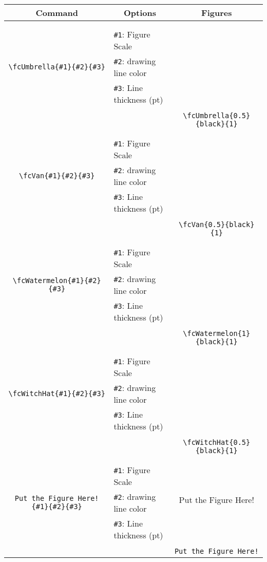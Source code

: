 \documentclass{article}
\begin{document}
\begin{table}[H]\centering\begin{tabular}{|c|l|c|}\hline {\bf Command}& \multicolumn{1}{c|}{{\bf Options}} & {\bf Figures}\\  \hline	&&\multirow{5}{*}{\fcUmbrella{0.5}{black}{1}}\\	&&\\	&\verb|#1|: Figure Scale &\\	\verb|\fcUmbrella{#1}{#2}{#3}|&	\verb|#2|: drawing line color &\\	&\verb|#3|: Line thickness (pt) &\\ &&\\&&	\verb|\fcUmbrella{0.5}{black}{1}|\\\hline 	
	&&\multirow{5}{*}{\fcVan{0.5}{black}{1}}\\	&&\\	&\verb|#1|: Figure Scale &\\	\verb|\fcVan{#1}{#2}{#3}|&	\verb|#2|: drawing line color &\\	&\verb|#3|: Line thickness (pt) &\\ &&\\&&	\verb|\fcVan{0.5}{black}{1}|\\\hline 	
	&&\multirow{5}{*}{\fcWatermelon{1}{black}{1}}\\	&&\\	&\verb|#1|: Figure Scale &\\	\verb|\fcWatermelon{#1}{#2}{#3}|&	\verb|#2|: drawing line color &\\	&\verb|#3|: Line thickness (pt) &\\ &&\\&&	\verb|\fcWatermelon{1}{black}{1}|\\\hline 	
	&&\multirow{5}{*}{\fcWitchHat{0.5}{black}{1}}\\	&&\\	&\verb|#1|: Figure Scale &\\	\verb|\fcWitchHat{#1}{#2}{#3}|&	\verb|#2|: drawing line color &\\	&\verb|#3|: Line thickness (pt) &\\ &&\\&&	\verb|\fcWitchHat{0.5}{black}{1}|\\\hline 	
	&&\multirow{5}{*}{Put the Figure Here!}\\	&&\\	&\verb|#1|: Figure Scale &\\	\verb|Put the Figure Here!{#1}{#2}{#3}|&	\verb|#2|: drawing line color &\\	&\verb|#3|: Line thickness (pt) &\\ &&\\&&	\verb|Put the Figure Here!|\\\hline 	

\end{tabular}
\end{table}
\end{document}
